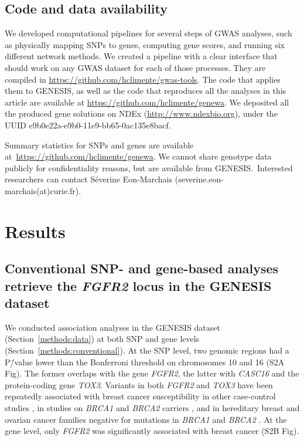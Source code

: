 \documentclass[10pt,letterpaper]{article}
\begin{document}
\subsection{Code and data availability}
\label{methods:code}

We developed computational pipelines for several steps of GWAS analyses, such as physically mapping SNPs to genes, computing gene scores, and running six different network methods. We created a pipeline with a clear interface that should work on any GWAS dataset for each of those processes. They are compiled in \url{https://github.com/hclimente/gwas-tools}. The code that applies them to GENESIS, as well as the code that reproduces all the analyses in this article are available at \url{https://github.com/hclimente/genewa}. We deposited all the produced gene solutions on NDEx (\url{http://www.ndexbio.org}), under the UUID e9b0e22a-e9b0-11e9-bb65-0ac135e8bacf.

Summary statistics for SNPs and genes are available at \url{https://github.com/hclimente/genewa}. We cannot share genotype data publicly for confidentiality reasons, but are available from GENESIS. Interested researchers can contact Séverine Eon-Marchais (severine.eon-marchais(at)curie.fr).

\section{Results}

\subsection{Conventional SNP- and gene-based analyses retrieve the \emph{FGFR2} locus in the GENESIS dataset}
\label{results:conventional}

We conducted association analyses in the GENESIS dataset (Section~\ref{methods:data}) at both SNP and gene levels (Section~\ref{methods:conventional}). At the SNP level, two genomic regions had a P\=/value lower than the Bonferroni threshold on chromosomes 10 and 16 (S2A Fig). The former overlaps with the gene \emph{FGFR2}, the latter with \emph{CASC16} and the protein-coding gene \emph{TOX3}. Variants in both \emph{FGFR2} and \emph{TOX3} have been repeatedly associated with breast cancer susceptibility in other case-control studies \cite{Michailidou2017}, in studies on \emph{BRCA1} and \emph{BRCA2} carriers \cite{Mulligan2011}, and in hereditary breast and ovarian cancer families negative for mutations in \emph{BRCA1} and \emph{BRCA2} \cite{rinella_genetic_2013}. At the gene level, only \emph{FGFR2} was significantly associated with breast cancer (S2B Fig).
\end{document}

